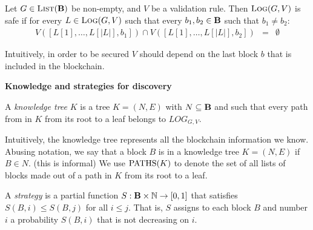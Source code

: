 %
%

\begin{mydef}
Let $G \in \text{\sc List}(\text{\bf B})$ be non-empty, and $V$ be a validation rule. Then $\text{\sc Log}(G,V)$ is safe if for every $L \in \text{\sc Log}(G,V)$ such that every $b_1, b_2 \in \text{\bf B}$ such that $b_1 \neq b_2$:
\begin{eqnarray*}
V([L[1], \ldots, L[|L|], b_1]) \cap V([L[1], \ldots, L[|L|], b_2]) & = & \emptyset
\end{eqnarray*}
\end{mydef}
Intuitively, in order to be secured $V$ should depend on the last block $b$ that is included in the blockchain.

\medskip
\noindent
\textbf{Knowledge and strategies for discovery}

\begin{mydef}
A \emph{knowledge tree} $K$ is a tree $K = (N,E)$ with $N \subseteq \text{\bf B}$ and such that 
every path from in $K$ from its root to a leaf belongs to $LOG_{G,V}$.
\end{mydef}

Intuitively, the knowledge tree represents all the blockchain information we know. 
Abusing notation, we say that a block $B$ is in a knowledge tree $K = (N,E)$ if $B \in N$. 
(this is informal) We use $\text{PATHS}(K)$ to denote the set of all lists of blocks made out of a path 
in $K$ from its root to a leaf. 

\begin{mydef}
A \emph{strategy} is a partial function $S: \text{\bf B} \times \mathbb{N} \rightarrow [0,1]$ that 
satisfies $S(B,i) \leq S(B,j)$ for all $i \leq j$. That is, $S$ assigns 
to each block $B$ and number $i$ a probability $S(B,i)$ that is not decreasing on $i$. 
\end{mydef}

